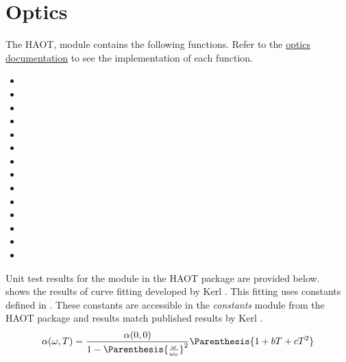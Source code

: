 \section{Optics\label{ch4:optics}}
The \gls{HAOT},  module contains the following
functions. Refer to the
\href{https://haot.readthedocs.io/en/latest/modules/optics.html}{optics documentation}
to see the implementation of each function.
\begin{itemize}
    \item {}
    \item {}
    \item {}
    \item {}
    \item {}
    \item {}
    \item {}
    \item {}
    \item {}
    \item {}
    \item {}
    \item {}
    \item {}
    \item {}
\end{itemize}
Unit test results for the  module in the
\gls{HAOT} package are provided below. \\

     shows the results of curve fitting developed
    by Kerl \cite{Kerl1992}. This fitting uses constants defined in
    . These constants are accessible in the
    \textit{constants} module from the \gls{HAOT} package and results match
    published results by Kerl \cite{Kerl1992}.
    \begin{equation}\label{eq:kerlFitting}
        \alpha(\omega,T) = \frac{\alpha(0,0)}{1 -
        \Parenthesis{\frac{\omega}{\omega_0}}^2} \Parenthesis{1 + bT + cT^2}
    \end{equation}
    

